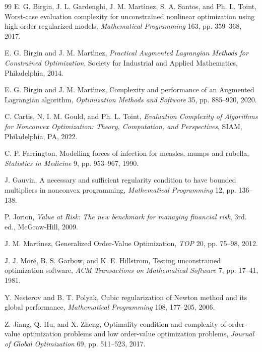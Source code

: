 \documentclass[11pt]{article}
\begin{document}
\begin{thebibliography}{99}
 E. G. Birgin, J. L. Gardenghi, J. M. Mart\'{\i}nez, S. A. Santos, and Ph. L. Toint, Worst-case evaluation complexity for unconstrained nonlinear optimization using high-order regularized models, \textit{Mathematical Programming} 163, pp. 359--368, 2017.

 E. G. Birgin and J. M. Mart\'{\i}nez, \textit{Practical Augmented Lagrangian Methods for Constrained Optimization}, Society for Industrial and Applied Mathematics, Philadelphia, 2014.

 E. G. Birgin and J. M. Mart\'{\i}nez, Complexity and performance of an Augmented Lagrangian algorithm, \textit{Optimization Methods and Software} 35, pp. 885--920, 2020.

 C. Cartis, N. I. M. Gould, and Ph. L. Toint, \textit{Evaluation Complexity of Algorithms for Nonconvex Optimization: Theory, Computation, and Perspectives}, SIAM, Philadelphia, PA, 2022.

 C. P. Farrington, Modelling forces of infection for measles, mumps and rubella, \textit{Statistics in Medicine} 9, pp. 953--967, 1990.

 J. Gauvin, A necessary and sufficient regularity condition to have bounded multipliers in nonconvex programming, \textit{Mathematical Programming} 12, pp. 136--138.
  
 P. Jorion, \textit{Value at {R}isk: {T}he new benchmark for managing financial risk}, 3rd. ed., McGraw-Hill, 2009.

 J. M. Mart\'{\i}nez, Generalized Order-Value Optimization, \textit{TOP} 20, pp. 75--98, 2012.

 J. J. Mor\'e, B. S. Garbow, and K. E. Hillstrom, Testing unconstrained optimization software, \textit{ACM Transactions on Mathematical Software} 7, pp. 17--41, 1981.
  
 Y. Nesterov and B. T. Polyak, Cubic regularization of Newton method and its global performance, \textit{Mathematical Programming} 108, 177--205, 2006.

 Z. Jiang, Q. Hu, and X. Zheng, Optimality condition and complexity of order-value optimization problems and low order-value optimization problems, \textit{Journal of Global Optimization} 69, pp. 511--523, 2017.
    
\end{thebibliography}
\end{document}
